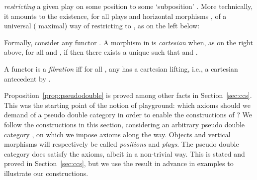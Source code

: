 \documentclass{LMCS}
\theoremstyle{plain}\newtheorem{satz}[thm]{Satz}
\begin{document}
\emph{restricting} a given play on some position  to some
`subposition' .  More technically, it amounts to the
existence, for all plays  and horizontal morphisms , of a universal ( maximal) way of restricting 
to , as on the left below:
Formally, consider any functor . A morphism  in  is \emph{cartesian} when, as on the right
above, for all  and ,
if  then there exists a unique  such that  and .
\begin{defi} 
  A functor  is a \emph{fibration} iff for all , any  has a cartesian lifting, i.e., a 
  cartesian antecedent by . 
\end{defi} 

Proposition~\ref{prop:pseudodouble} is proved among other facts in
Section~\ref{sec:ccs}.  This was the starting point of the
notion of playground: which axioms should we demand of a pseudo double
category in order to enable the constructions of
?  We follow the constructions in this
section, considering an arbitrary pseudo double category , on
which we impose axioms along the way. Objects and vertical
morphisms will respectively be called \emph{positions} and
\emph{plays}. The pseudo double category  does satisfy the
axioms, albeit in a non-trivial way. This is stated and proved in
Section~\ref{sec:ccs}, but we use the result in advance in examples to
illustrate our constructions. 
\end{document}
